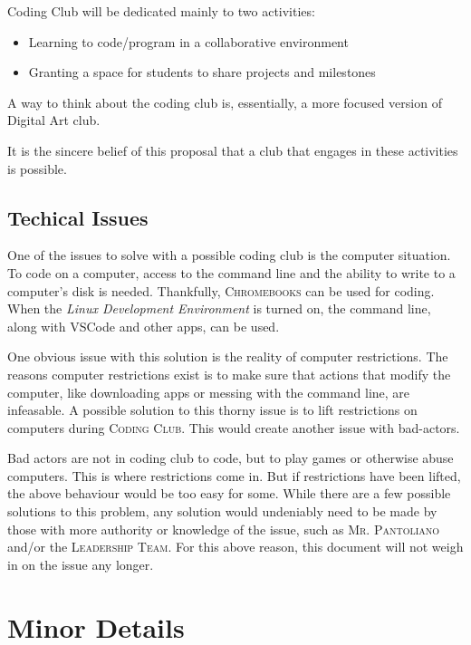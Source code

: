 \documentclass{report}
\begin{document}
            Coding Club will be dedicated mainly to two activities:
            \begin{itemize}
                \item Learning to code/program in a collaborative environment
                \item Granting a space for students to share projects and milestones
            \end{itemize}

            A way to think about the coding club is, essentially, a more focused version of Digital Art club.

            It is the sincere belief of this proposal that a club that engages in these activities is possible.

        \subsection{Techical Issues}

            One of the issues to solve with a possible coding club is the computer situation. To code on a computer, access to the command line and the ability to write to a computer's disk is needed. Thankfully, \textsc{Chromebooks} can be used for coding. When the \textit{Linux Development Environment} is turned on, the command line, along with VSCode and other apps, can be used.

            One obvious issue with this solution is the reality of computer restrictions. The reasons computer restrictions exist is to make sure that actions that modify the computer, like downloading apps or messing with the command line, are infeasable. A possible solution to this thorny issue is to lift restrictions on computers during \textsc{Coding Club}. This would create another issue with bad-actors.

            Bad actors are not in coding club to code, but to play games or otherwise abuse computers. This is where restrictions come in. But if restrictions have been lifted, the above behaviour would be too easy for some. While there are a few possible solutions to this problem, any solution would undeniably need to be made by those with more authority or knowledge of the issue, such as \textsc{Mr. Pantoliano} and/or the \textsc{Leadership Team}. For this above reason, this document will not weigh in on the issue any longer.

        \section{Minor Details}
\end{document}
